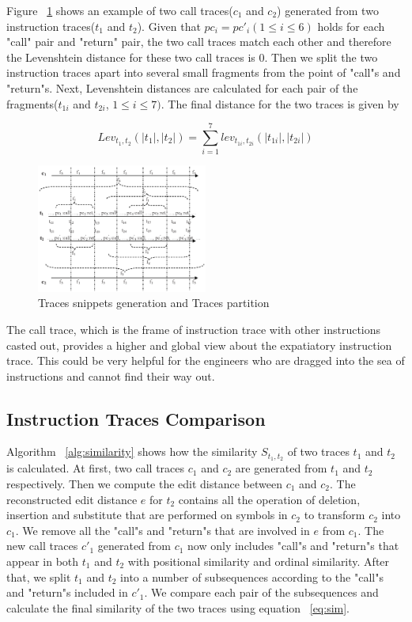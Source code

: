 \documentclass[10pt,journal,cspaper,compsoc]{IEEEtran}
\begin{document}
Figure ~\ref{fig:calltrace} shows an example of two call
traces($c_1$ and $c_2$) generated from two instruction traces($t_1$
and $t_2$). Given that $pc_i=pc'_i (1\leq i\leq 6)$ holds for each
"call" pair and "return" pair, the two call traces match
each other and therefore the Levenshtein distance for these two call
traces is 0. Then we split the two instruction traces apart into
several small fragments from the point of "call"s and "return"s.
Next, Levenshtein distances are calculated for each pair of the
fragments($t_{1i}$ and $t_{2i}$, $1\leq i\leq 7)$. The final
distance for the two traces is given by

\begin{equation}\label{eq:callle}
 Lev_{t_{1},t_{2}}(|t_1|,|t_2|) =\sum_{i=1}^{7}lev_{t_{1i},t_{2i}}(|t_{1i}|, |t_{2i}|)
\end{equation}


\begin{figure}
\centering
\includegraphics[width=0.5\textwidth]{fig/call1.eps}
\caption{Traces snippets generation and Traces partition }
\label{fig:calltrace}       %
\end{figure}

The call trace, which is the frame of instruction trace with other
instructions casted out, provides a higher and global view about the
expatiatory instruction trace. This could be very helpful for the
engineers who are dragged into the sea of instructions and cannot
find their way out.

\subsection{Instruction Traces Comparison}
\label{sec:ITC}
Algorithm ~\ref{alg:similarity} shows how the
similarity $S_{t_1, t_2}$ of two traces $t_1$ and $t_2$ is calculated. At
first, two call traces $c_1$ and $c_2$ are generated from $t_1$ and
$t_2$ respectively. Then we compute the edit distance between $c_1$
and $c_2$. The reconstructed edit distance $e$ for $t_2$ contains
all the operation of deletion, insertion and substitute that are
performed on symbols in $c_2$ to transform $c_2$ into $c_1$. We
remove all the "call"s and "return"s that are involved in $e$ from
$c_1$. The new call traces $c'_1$ generated from $c_1$ now only
includes "call"s and "return"s that appear in both $t_1$ and $t_2$
with positional similarity and ordinal similarity. After that, we
split $t_1$ and $t_2$ into a number of subsequences according to the
"call"s and "return"s included in $c'_1$. We compare each pair of
the subsequences and calculate the final similarity of the two
traces using equation ~\ref{eq:sim}.
\end{document}
